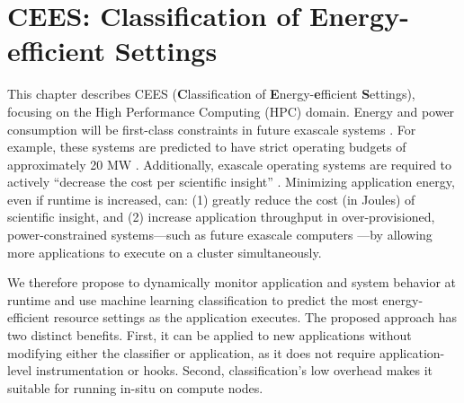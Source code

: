 \chapter{CEES: Classification of Energy-efficient Settings}

This chapter describes CEES (\textbf{C}lassification of \textbf{E}nergy-\textbf{e}fficient \textbf{S}ettings), focusing on the High Performance Computing (HPC) domain.
Energy and power consumption will be first-class constraints in future exascale systems \cite{exaosr-power}.
For example, these systems are predicted to have strict operating budgets of approximately 20 MW \cite{Exascale20MW}.
Additionally, exascale operating systems are required to actively ``decrease the cost per scientific insight'' \cite{DOEML}.  
Minimizing application energy, even if runtime is increased, can: (1) greatly reduce the cost (in Joules) of scientific insight, and (2) increase application throughput in over-provisioned, power-constrained systems---such as future exascale computers \cite{PatkiRMAP,Sarood2013}---by allowing more applications to execute on a cluster simultaneously.

We therefore propose to dynamically monitor application and system behavior at runtime and use machine learning classification to predict the most energy-efficient resource settings as the application executes.
The proposed approach has two distinct benefits.
First, it can be applied to new applications without modifying either the classifier or application, as it does not require application-level instrumentation or hooks.
Second, classification's low overhead makes it suitable for running in-situ on compute nodes.






